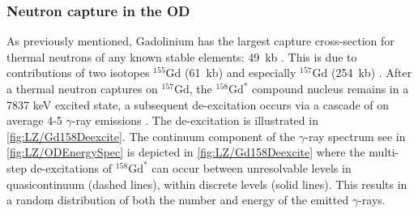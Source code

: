 \subsubsection{Neutron capture in the OD}\label{sec:LZ/NeutronCapture}
As previously mentioned, Gadolinium has the largest capture cross-section for thermal neutrons of any known stable elements: 49~kb \cite{Hagiwara:2018kmr}. This is due to contributions of two isotopes $^{155}\text{Gd}$ (61~kb) and especially $^{157}\text{Gd}$ (254~kb) \cite{Hagiwara:2018kmr}. After a thermal neutron captures on $^{157}\text{Gd}$, the $^{158}\text{Gd}^*$ compound nucleus remains in a 7837 keV excited state, a subsequent de-excitation occurs via a cascade of on average 4-5 $\gamma$-ray emissions \cite{Hagiwara:2018kmr}. The de-excitation is illustrated in \autoref{fig:LZ/Gd158Deexcite}. The continuum component of the $\gamma$-ray spectrum see in \autoref{fig:LZ/ODEnergySpec} is depicted in \autoref{fig:LZ/Gd158Deexcite} where the multi-step de-excitations of $^{158}\text{Gd}^*$ can occur between unresolvable levels in quasicontinuum (dashed lines), within discrete levels (solid lines). This results in a random distribution of both the number and energy of the emitted $\gamma$-rays. 

